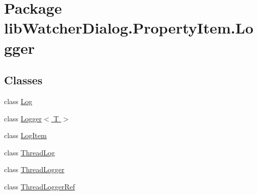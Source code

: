 \hypertarget{namespacelib_watcher_dialog_1_1_property_item_1_1_logger}{\section{Package lib\+Watcher\+Dialog.\+Property\+Item.\+Logger}
\label{namespacelib_watcher_dialog_1_1_property_item_1_1_logger}
}
\subsection*{Classes}
\begin{DoxyCompactItemize}
\item 
class \hyperlink{classlib_watcher_dialog_1_1_property_item_1_1_logger_1_1_log}{Log}
\item 
class \hyperlink{classlib_watcher_dialog_1_1_property_item_1_1_logger_1_1_logger_3_01_t_01_4}{Logger$<$ T $>$}
\item 
class \hyperlink{classlib_watcher_dialog_1_1_property_item_1_1_logger_1_1_log_item}{Log\+Item}
\item 
class \hyperlink{classlib_watcher_dialog_1_1_property_item_1_1_logger_1_1_thread_log}{Thread\+Log}
\item 
class \hyperlink{classlib_watcher_dialog_1_1_property_item_1_1_logger_1_1_thread_logger}{Thread\+Logger}
\item 
class \hyperlink{classlib_watcher_dialog_1_1_property_item_1_1_logger_1_1_thread_logger_ref}{Thread\+Logger\+Ref}
\end{DoxyCompactItemize}
